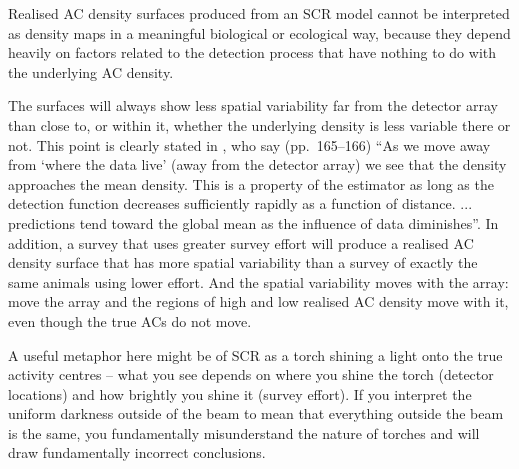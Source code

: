 \documentclass[useAMS,usenatbib,referee]{biom}
\begin{document}

Realised AC density surfaces produced from an SCR model cannot be interpreted as density maps in a meaningful biological or ecological way, because they depend heavily on factors related to the detection process that have nothing to do with the underlying AC density. 

The surfaces will always show less spatial variability far from the detector array than close to, or within it, whether the underlying density is less variable there or not. This point is clearly stated in \cite{Royle+al:13a}, who say (pp.\ 165--166) ``As we move away from `where the data live' (away from the detector array) we see that the density approaches the mean density. This is a property of the estimator as long as the detection function decreases sufficiently rapidly as a function of distance. ... predictions tend toward the global mean as the influence of data diminishes''. In addition, a survey that uses greater survey effort will produce a realised AC density surface that has more spatial variability than a survey of exactly the same animals using lower effort. And the spatial variability moves with the array: move the array and the regions of high and low realised AC density move with it, even though the true ACs do not move.

A useful metaphor here might be of SCR as a torch shining a light onto the true activity centres -- what you see depends on where you shine the torch (detector locations) and how brightly you shine it (survey effort). If you interpret the uniform darkness outside of the beam to mean that everything outside the beam is the same, you fundamentally misunderstand the nature of torches and will draw fundamentally incorrect conclusions.

\end{document}
